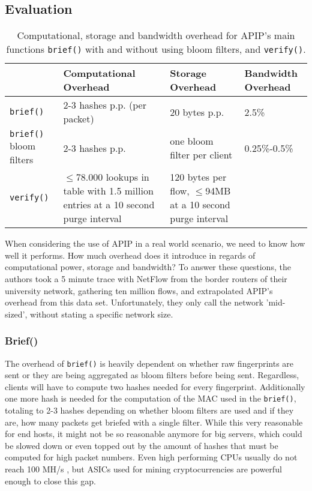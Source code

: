 \documentclass{acm_proc_article-sp}
\begin{document}
\subsection{Evaluation}
\begin{table*}[t]
	\label{tab:evalcomparison}
	\renewcommand{\arraystretch}{1.5}
	\begin{tabularx}{\textwidth}{lXXX}
		\hline 
 		& \textbf{Computational Overhead} & \textbf{Storage Overhead} & \textbf{Bandwidth Overhead} \\ \hline
		\texttt{brief()} & 2-3 hashes p.p. (per packet) & 20 bytes p.p. & 2.5\% \\ 
		\texttt{brief()} bloom filters & 2-3 hashes p.p. & one bloom filter per client & 0.25\%-0.5\% \\ 
		\texttt{verify()} & $\le$78.000 lookups in table with 1.5 million entries at a 10 second purge interval & 120 bytes per flow, $\le$94MB at a 10 second purge interval & \\ 
		\hline
	\end{tabularx}
	\caption{Computational, storage and bandwidth overhead for APIP's main functions \texttt{brief()} with and without using bloom filters, and \texttt{verify()}.}
\end{table*}
When considering the use of APIP in a real world scenario, we need to know how well it performs. How much overhead does it introduce in regards of computational power, storage and bandwidth? To answer these questions, the authors took a 5 minute trace with NetFlow from the border routers of their university network, gathering ten million flows, and extrapolated APIP's overhead from this data set. Unfortunately, they only call the network 'mid-sized', without stating a specific network size.

\subsubsection{Brief()}
The overhead of \texttt{brief()} is heavily dependent on whether raw fingerprints are sent or they are being aggregated as bloom filters before being sent. Regardless, clients will have to compute two hashes needed for every fingerprint. Additionally one more hash is needed for the computation of the MAC used in the \texttt{brief()}, totaling to 2-3 hashes depending on whether bloom filters are used and if they are, how many packets get briefed with a single filter. While this very reasonable for end hosts, it might not be so reasonable anymore for big servers, which could be slowed down or even topped out by the amount of hashes that must be computed for high packet numbers. Even high performing CPUs usually do not reach 100 MH/s \cite{hashes}, but ASICs used for mining cryptocurrencies are powerful enough to close this gap.
\end{document}
